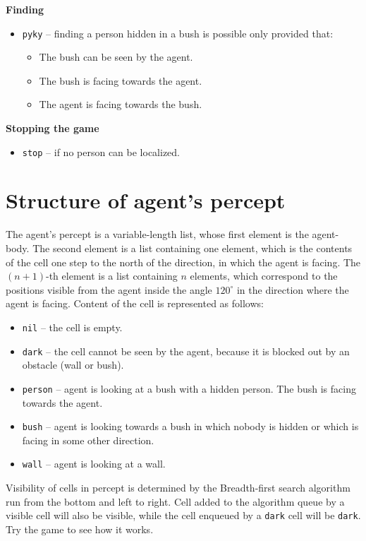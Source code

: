 \documentclass[a4paper,12pt]{article}
\begin{document}
\textbf{Finding}
\begin{itemize}
\item \texttt{pyky} -- finding a person hidden in a bush is possible only provided that:
\begin{itemize}
\item The bush can be seen by the agent.
\item The bush is facing towards the agent.
\item The agent is facing towards the bush.
\end{itemize}
\end{itemize}

\textbf{Stopping the game}
\begin{itemize}
\item \texttt{stop} -- if no person can be localized.
\end{itemize}

\section*{Structure of agent's percept}
The agent's percept is a variable-length list, whose first element is the agent-body. The second element is a list
containing one element, which is the contents of the cell one step to the north of the direction, in which the agent is
facing. The $(n+1)$-th element is a list containing $n$ elements, which correspond to the positions visible from
the agent inside the angle $120^\circ$ in the direction where the agent is facing. Content of the cell is represented as follows:

\begin{itemize}
\item \texttt{nil} -- the cell is empty.
\item \texttt{dark} -- the cell cannot be seen by the agent, because it is blocked out by an obstacle (wall or bush).
\item \texttt{person} -- agent is looking at a bush with a hidden person. The bush is facing towards the agent.
\item \texttt{bush} -- agent is looking towards a bush in which nobody is hidden or which is facing in some other direction.
\item \texttt{wall} -- agent is looking at a wall.
\end{itemize}

Visibility of cells in percept is determined by the Breadth-first search algorithm run from the bottom and left to
right. Cell added to the algorithm queue by a visible cell will also be visible, while the cell enqueued by a
\texttt{dark} cell will be \texttt{dark}. Try the game to see how it works.
\end{document}
